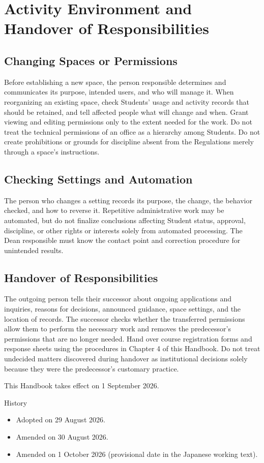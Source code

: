 \newpage
\chapter{Activity Environment and Handover of Responsibilities}

\section{Changing Spaces or Permissions}

Before establishing a new space, the person responsible determines and communicates its purpose, intended users, and who will manage it.
When reorganizing an existing space, check Students' usage and activity records that should be retained, and tell affected people what will change and when.
Grant viewing and editing permissions only to the extent needed for the work. Do not treat the technical permissions of an office as a hierarchy among Students.
Do not create prohibitions or grounds for discipline absent from the Regulations merely through a space's instructions.

\section{Checking Settings and Automation}

The person who changes a setting records its purpose, the change, the behavior checked, and how to reverse it.
Repetitive administrative work may be automated, but do not finalize conclusions affecting Student status, approval, discipline, or other rights or interests solely from automated processing.
The Dean responsible must know the contact point and correction procedure for unintended results.

\section{Handover of Responsibilities}

The outgoing person tells their successor about ongoing applications and inquiries, reasons for decisions, announced guidance, space settings, and the location of records.
The successor checks whether the transferred permissions allow them to perform the necessary work and removes the predecessor's permissions that are no longer needed.
Hand over course registration forms and response sheets using the procedures in Chapter 4 of this Handbook.
Do not treat undecided matters discovered during handover as institutional decisions solely because they were the predecessor's customary practice.

\bigskip
\noindent This Handbook takes effect on 1 September 2026.

\begin{samepage}
\bigskip
\noindent History
\begin{itemize}
  \item Adopted on 29 August 2026.
  \item Amended on 30 August 2026.
  \item Amended on 1 October 2026 (provisional date in the Japanese working text).
\end{itemize}
\end{samepage}
